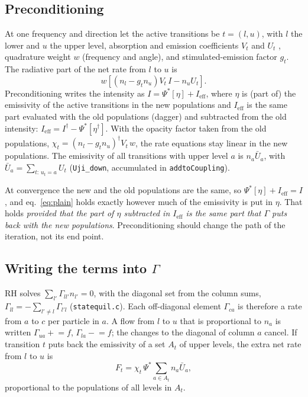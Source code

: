 \documentclass[11pt,a4paper]{article}
\newcommand{\code}[1]{\texttt{#1}}
\begin{document}
\subsection{Preconditioning}
At one frequency and direction let the active transitions be
$t=(l,u)$, with $l$ the lower and $u$ the upper level, absorption and
emission coefficients $V_t$ and $U_t$ \citep[eqs.~2.2--2.3]{1992A&A...262..209R},
quadrature weight $w$ (frequency and angle), and stimulated-emission
factor $g_t$. The radiative part of the net rate from $l$ to $u$ is
\begin{equation}
  w\left[(n_l - g_t n_u)V_t\, I - n_u U_t\right].
  \label{eq:plain}
\end{equation}
Preconditioning \citep{1992A&A...262..209R} writes the intensity as
$I = \Psi^*[\eta] + I_\text{eff}$, where $\eta$ is (part of) the
emissivity of the active transitions in the new populations and
$I_\text{eff}$ is the same part evaluated with the old populations
(dagger) and subtracted from the old intensity:
$I_\text{eff} = I^\dagger - \Psi^*[\eta^\dagger]$. With the opacity factor
taken from the old populations, $\chi_t = (n_l-g_tn_u)^\dagger V_t\,w$,
the rate equations stay linear in the new populations. The emissivity
of all transitions with upper level $a$ is $n_a\bar U_a$, with
$\bar U_a = \sum_{t:\,u_t=a} U_t$ (\code{Uji\_down}, accumulated in
\code{addtoCoupling}).

At convergence the new and the old populations are the same, so
$\Psi^*[\eta]+I_\text{eff} = I$, and eq.~\eqref{eq:plain} holds exactly
however much of the emissivity is put in $\eta$. That holds \emph{provided
that the part of $\eta$ subtracted in $I_\text{eff}$ is the same part
that $\Gamma$ puts back with the new populations}. Preconditioning should
change the path of the iteration, not its end point.

\subsection[Writing the terms into Gamma]{Writing the terms into $\Gamma$}
RH solves $\sum_{l'}\Gamma_{ll'}n_{l'} = 0$, with the diagonal set from
the column sums, $\Gamma_{ll} = -\sum_{l'\ne l}\Gamma_{l'l}$
(\code{statequil.c}). Each off-diagonal element $\Gamma_{ca}$ is therefore a
rate from $a$ to $c$ per particle in $a$. A flow from $l$ to $u$ that
is proportional to $n_a$ is written $\Gamma_{ua} \mathrel{+}= f$,
$\Gamma_{la} \mathrel{-}= f$; the changes to the diagonal of column $a$
cancel. If transition $t$ puts back the emissivity of a set $A_t$ of
upper levels, the extra net rate from $l$ to $u$ is
\begin{equation}
  F_t = \chi_t\,\Psi^*\sum_{a\in A_t} n_a \bar U_a ,
  \label{eq:Ft}
\end{equation}
proportional to the populations of all levels in $A_t$.
\end{document}

